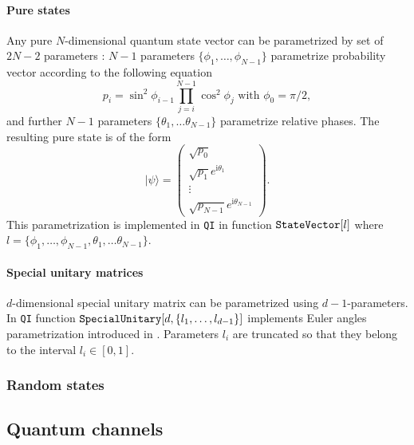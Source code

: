 \documentclass[11pt,a4paper]{article}
\newcommand{\qi}{\texttt{QI}}
\newcommand{\ket}[1]{\ensuremath{|#1\rangle}}
\newcommand{\1}{{\bf 1}}
\newcommand{\ii}{\mathrm{i}}
\newcommand{\fname}[1]{\text{\texttt{#1}}}
\begin{document}
\paragraph{Pure states}
Any pure $N$-dimensional quantum state vector can be parametrized by set of 
$2N-2$ parameters \cite{vedra98entanglement}: $N-1$ parameters $\{\phi_1, 
\ldots, 
\phi_{N-1}\}$ parametrize probability vector according to the following equation
\begin{equation}
p_i=\sin^2\phi_{i-1} \prod\limits_{j=i}^{N-1}\cos^2\phi_j\text{\ \ with 
}\phi_0=\pi/2,
\end{equation}
and further $N-1$ parameters $\{\theta_1, \ldots
\theta_{N-1}\}$ parametrize relative phases. The resulting pure state 
is of the form
\begin{equation}
\ket{\psi}=
\left(
\begin{array}{c}
\sqrt{p_0}\\
\sqrt{p_1}e^{\ii \theta_1}\\
\vdots\\
\sqrt{p_{N-1}}e^{\ii \theta_{N-1}}
\end{array}
\right).
\end{equation}
This parametrization is implemented in \qi{} in function
$\fname{StateVector}[l]$ where $l=\{\phi_1, \ldots, \phi_{N-1}, \theta_1, \ldots
\theta_{N-1}\}$.

\paragraph{Special unitary matrices}
$d$-dimensional special unitary matrix can be parametrized using 
$d-1$-parameters. In \qi{} function 
$\fname{SpecialUnitary}[d,\{l_1,\ldots,l_{d-1}\}]$ 
implements Euler angles parametrization introduced in 
\cite{zyczkowski94random}. Parameters $l_i$ are 
truncated so that they belong to the interval $l_i\in [0,1]$.
\subsubsection{Random states}

\subsection{Quantum channels}
\end{document}
